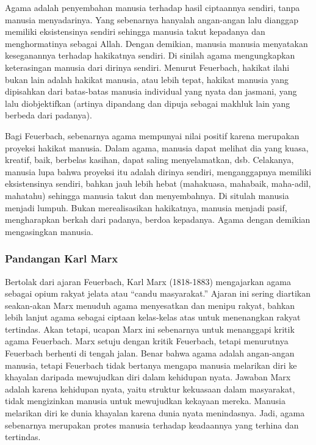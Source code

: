 \documentclass[10pt,a4paper]{article}
\begin{document}
\begin{multicols}{2}
Agama adalah penyembahan manusia terhadap hasil ciptaannya sendiri,
tanpa manusia menyadarinya. Yang sebenarnya hanyalah angan-angan lalu
dianggap memiliki eksistensinya sendiri sehingga manusia takut kepadanya
dan menghormatinya sebagai Allah. Dengan demikian, manusia manusia
menyatakan keseganannya terhadap hakikatnya sendiri. Di sinilah agama
mengungkapkan keterasingan manusia dari dirinya sendiri. Menurut
Feuerbach, hakikat ilahi bukan lain adalah hakikat manusia, atau lebih
tepat, hakikat manusia yang dipisahkan dari batas-batas manusia
individual yang nyata dan jasmani, yang lalu diobjektifkan (artinya
dipandang dan dipuja sebagai makhluk lain yang berbeda dari padanya).

Bagi Feuerbach, sebenarnya agama mempunyai nilai positif karena
merupakan proyeksi hakikat manusia. Dalam agama, manusia dapat melihat
dia yang kuasa, kreatif, baik, berbelas kasihan, dapat saling
menyelamatkan, dsb. Celakanya, manusia lupa bahwa proyeksi itu adalah
dirinya sendiri, menganggapnya memiliki eksistensinya sendiri, bahkan
jauh lebih hebat (mahakuasa, mahabaik, maha-adil, mahatahu) sehingga
manusia takut dan menyembahnya. Di situlah manusia menjadi lumpuh. Bukan
merealisasikan hakikatnya, manusia menjadi pasif, mengharapkan berkah
dari padanya, berdoa kepadanya. Agama dengan demikian mengasingkan
manusia.

\hypertarget{pandangan-karl-marx}{%
\subsubsection{Pandangan Karl Marx}\label{pandangan-karl-marx}}

Bertolak dari ajaran Feuerbach, Karl Marx (1818-1883) mengajarkan agama
sebagai opium rakyat jelata atau ``candu masyarakat.'' Ajaran ini sering
diartikan seakan-akan Marx menuduh agama menyesatkan dan menipu rakyat,
bahkan lebih lanjut agama sebagai ciptaan kelas-kelas atas untuk
menenangkan rakyat tertindas. Akan tetapi, ucapan Marx ini sebenarnya
untuk menanggapi kritik agama Feuerbach. Marx setuju dengan kritik
Feuerbach, tetapi menurutnya Feuerbach berhenti di tengah jalan. Benar
bahwa agama adalah angan-angan manusia, tetapi Feuerbach tidak bertanya
mengapa manusia melarikan diri ke khayalan daripada mewujudkan diri
dalam kehidupan nyata. Jawaban Marx adalah karena kehidupan nyata, yaitu
struktur kekuasaan dalam masyarakat, tidak mengizinkan manusia untuk
mewujudkan kekayaan mereka. Manusia melarikan diri ke dunia khayalan
karena dunia nyata menindasnya. Jadi, agama sebenarnya merupakan protes
manusia terhadap keadaannya yang terhina dan tertindas.


\end{multicols}
\end{document}
